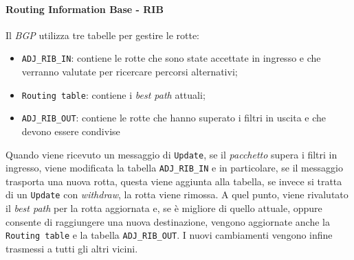\paragraph{Routing Information Base - RIB}
Il \emph{BGP} utilizza tre tabelle per gestire le rotte:
\begin{itemize}
    \item \texttt{ADJ\_RIB\_IN}: contiene le rotte che sono state accettate in
    ingresso e che verranno valutate per ricercare percorsi alternativi;
    \item \texttt{Routing table}: contiene i \emph{best path} attuali;
    \item \texttt{ADJ\_RIB\_OUT}: contiene le rotte che hanno superato i filtri
    in uscita e che devono essere condivise
\end{itemize}
Quando viene ricevuto un messaggio di \texttt{Update}, se il \emph{pacchetto}
supera i filtri in ingresso, viene modificata la tabella \texttt{ADJ\_RIB\_IN}
e in particolare, se il messaggio trasporta una nuova rotta, questa viene aggiunta
alla tabella, se invece si tratta di un \texttt{Update} con \emph{withdraw}, la
rotta viene rimossa. A quel punto, viene rivalutato il \emph{best path} per la
rotta aggiornata e, se è migliore di quello attuale, oppure consente di raggiungere
una nuova destinazione, vengono aggiornate anche la \texttt{Routing table} e la
tabella \texttt{ADJ\_RIB\_OUT}. I nuovi cambiamenti vengono infine trasmessi
a tutti gli altri vicini.